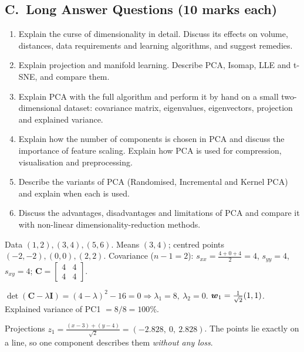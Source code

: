 \subsection*{C.\ Long Answer Questions (10 marks each)}
\begin{enumerate}
  \item Explain the curse of dimensionality in detail. Discuss its effects on volume, distances, data requirements and learning algorithms, and suggest remedies. 
  \item Explain projection and manifold learning. Describe PCA, Isomap, LLE and t-SNE, and compare them. 
  \item Explain PCA with the full algorithm and perform it by hand on a small two-dimensional dataset: covariance matrix, eigenvalues, eigenvectors, projection and explained variance. 
  \item Explain how the number of components is chosen in PCA and discuss the importance of feature scaling. Explain how PCA is used for compression, visualisation and preprocessing. 
  \item Describe the variants of PCA (Randomised, Incremental and Kernel PCA) and explain when each is used. 
  \item Discuss the advantages, disadvantages and limitations of PCA and compare it with non-linear dimensionality-reduction methods. 
\end{enumerate}

\begin{modelans}
Data $(1,2),(3,4),(5,6)$. Means $(3,4)$; centred points $(-2,-2),(0,0),(2,2)$. Covariance ($n-1=2$): $s_{xx}=\frac{4+0+4}{2}=4$, $s_{yy}=4$, $s_{xy}=4$; $\mathbf C=\begin{bmatrix}4&4\\4&4\end{bmatrix}$.\par
$\det(\mathbf C-\lambda\mathbf I)=(4-\lambda)^2-16=0\Rightarrow\lambda_1=8,\ \lambda_2=0$. $\boldsymbol{w}_1=\frac1{\sqrt2}(1,1)$. Explained variance of PC1 $=8/8=100\%$.\par
Projections $z_1=\frac{(x-3)+(y-4)}{\sqrt2}=(-2.828,\ 0,\ 2.828)$. The points lie exactly on a line, so one component describes them \emph{without any loss}.
\end{modelans}

